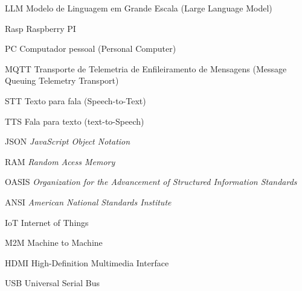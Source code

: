 \begin{siglas}

\item[LLM] Modelo de Linguagem em Grande Escala (Large Language Model)
\item[Rasp] Raspberry PI
\item[PC]	Computador pessoal (Personal Computer)
\item[MQTT]	Transporte de Telemetria de Enfileiramento de Mensagens (Message Queuing Telemetry Transport)
\item[STT]	Texto para fala (Speech-to-Text)
\item[TTS]	Fala para texto (text-to-Speech)
\item[JSON]	\textit{JavaScript Object Notation}
\item[RAM]	\textit{Random Acess Memory}
\item[OASIS]	\textit{Organization for the Advancement of Structured Information Standards}
\item[ANSI]	\textit{American National Standards Institute }	
\item[IoT] Internet of Things
\item[M2M] Machine to Machine
\item[HDMI] High-Definition Multimedia Interface
\item[USB] Universal Serial Bus

    
\end{siglas}